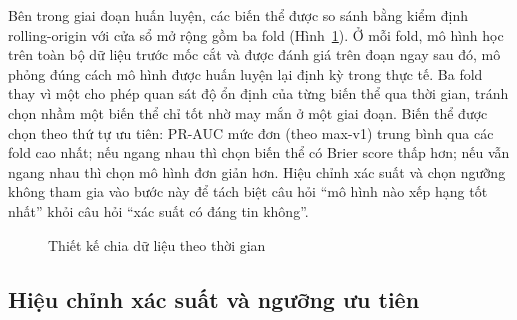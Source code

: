 \documentclass[12pt,a4paper]{report}
\begin{document}
Bên trong giai đoạn huấn luyện, các biến thể được so sánh bằng kiểm định rolling-origin với cửa sổ mở rộng gồm ba fold (Hình~\ref{fig:temporal-folds}). Ở mỗi fold, mô hình học trên toàn bộ dữ liệu trước mốc cắt và được đánh giá trên đoạn ngay sau đó, mô phỏng đúng cách mô hình được huấn luyện lại định kỳ trong thực tế. Ba fold thay vì một cho phép quan sát độ ổn định của từng biến thể qua thời gian, tránh chọn nhầm một biến thể chỉ tốt nhờ may mắn ở một giai đoạn. Biến thể được chọn theo thứ tự ưu tiên: PR-AUC mức đơn (theo max-v1) trung bình qua các fold cao nhất; nếu ngang nhau thì chọn biến thể có Brier score thấp hơn; nếu vẫn ngang nhau thì chọn mô hình đơn giản hơn. Hiệu chỉnh xác suất và chọn ngưỡng không tham gia vào bước này để tách biệt câu hỏi ``mô hình nào xếp hạng tốt nhất'' khỏi câu hỏi ``xác suất có đáng tin không''.

\begin{figure}[htbp]\centering
{}
\caption{Thiết kế chia dữ liệu theo thời gian}
\label{fig:temporal-folds}
\end{figure}

\subsection{Hiệu chỉnh xác suất và ngưỡng ưu tiên}
\end{document}
